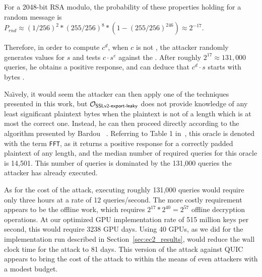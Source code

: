 For a 2048-bit RSA modulo, the probability of these properties holding for a random message is
$P_{rnd} \approx (1/256)^2 * (255/256)^{8} * (1 - (255/256)^{246}) \approx 2^{-17}$.

Therefore, in order to compute $c^d$, when $c$ is not \sslconform,
the attacker randomly generates values for $s$ and tests
$c \cdot s^{e}$ against the \tOracleSSLleaky.
After roughly $2^{17} \approx 131,000$ queries, he obtains a positive response,
and can deduce that $c^d \cdot s$ starts with bytes .

Na\"{\i}vely, it would seem the attacker can then apply one of the techniques
presented in this work, but $\mathcal{O}_\textsf{SSLv2-export-leaky}$ does not provide knowledge of
any least significant plaintext bytes when the plaintext is not of
a length which is at most the correct one.
Instead, he can then proceed directly according to the algorithm presented by
Bardou \etal~\cite{efficient-padding-oracle-2012}.
Referring to Table 1 in~\cite{efficient-padding-oracle-2012},
this oracle is denoted with the term \texttt{FFT},
as it returns a positive response for a correctly padded plaintext of any length,
and the median number of required queries for this oracle is 14,501.
This number of queries is dominated by the 131,000 queries the attacker has already executed.

As for the cost of the attack, executing roughly 131,000 queries would require
only three hours at a rate of 12 queries/second.
The more costly requirement appears to be the offline work, which requires
$ 2^{17} * 2^{40} = 2^{57}$ offline decryption operations.
At our optimized GPU implementation rate of 515 million keys per second,
this would require 3238 GPU days.
Using 40 GPUs, as we did for the implementation run described in Section~\ref{sec:ec2_results}, would reduce the wall clock time for the attack to 81 days.
This version of the attack against QUIC appears to bring the cost of the attack
to within the means of even attackers with a modest budget.
\fi


